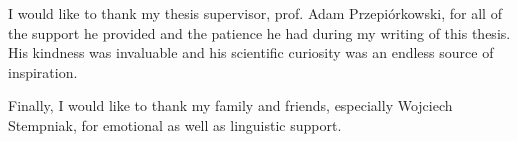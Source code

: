 I would like to thank my thesis supervisor, prof. Adam Przepiórkowski, for all of the support he provided and the patience he had during my writing of this thesis. His kindness was invaluable and his scientific curiosity was an endless source of inspiration. %


Finally, I would like to thank my family and friends, especially Wojciech Stempniak, for emotional as well as linguistic support. 